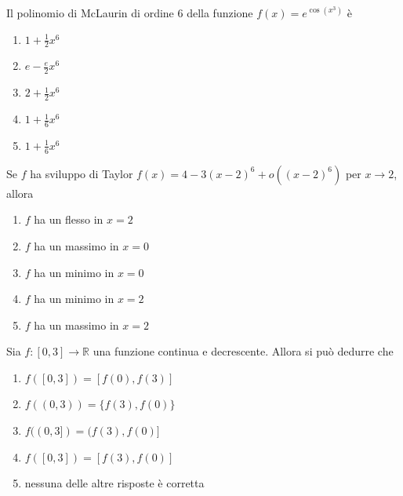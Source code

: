 \begin{quiz}
Il polinomio di McLaurin di ordine $6$ della funzione $f(x)=e^{\cos(x^3)}$ \`e
\begin{enumerate}
\item $1+\frac12x^6$
\item $e-\frac e2x^6$
\item $2+\frac12x^6$
\item $1+\frac16x^6$
\item $1+\frac16x^6$
\end{enumerate}
\end{quiz}

\begin{quiz}
Se $f$ ha sviluppo di Taylor $f(x)=4-3(x-2)^6+o((x-2)^6)$ per $x\to2$, allora
\begin{enumerate}
\item $f$ ha un flesso in $x=2$
\item $f$ ha un massimo in $x=0$
\item $f$ ha un minimo in $x=0$
\item $f$ ha un minimo in $x=2$
\item $f$ ha un massimo in $x=2$
\end{enumerate}
\end{quiz}

\begin{quiz}
Sia $f:[0,3]\to\mathbb R$ una funzione continua e decrescente. Allora si pu\`o dedurre che
\begin{enumerate}
\item $f([0,3])=[f(0),f(3)]$
\item $f((0,3))=\{f(3),f(0)\}$
\item $f((0,3])=(f(3),f(0)]$
\item $f([0,3])=[f(3),f(0)]$
\item nessuna delle altre risposte \`e corretta
\end{enumerate}
\end{quiz}

